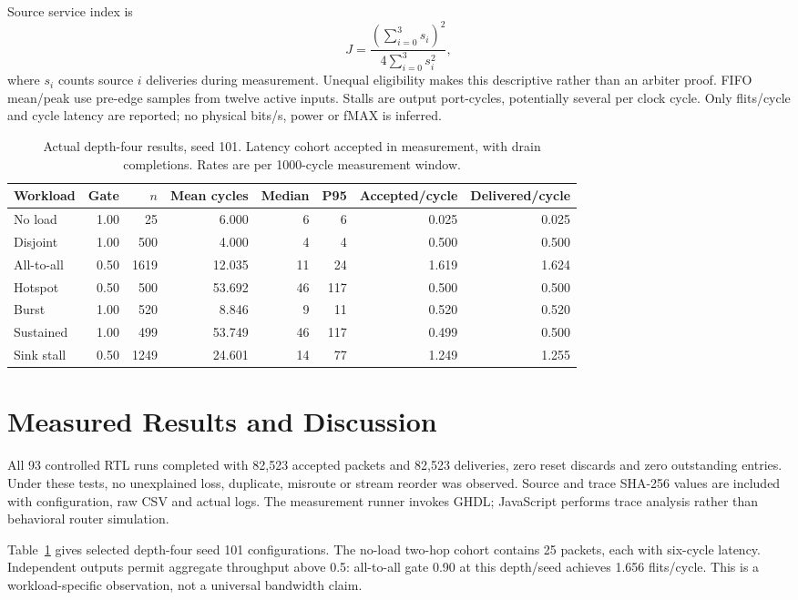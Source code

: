 \documentclass[conference,a4paper]{IEEEtran}
\begin{document}
Source service index is
\begin{equation}
J=\frac{(\sum_{i=0}^{3}s_i)^2}{4\sum_{i=0}^{3}s_i^2},
\end{equation}
where $s_i$ counts source $i$ deliveries during measurement. Unequal eligibility makes this descriptive rather than an arbiter proof. FIFO mean/peak use pre-edge samples from twelve active inputs. Stalls are output port-cycles, potentially several per clock cycle. Only flits/cycle and cycle latency are reported; no physical bits/s, power or fMAX is inferred.
\begin{table}[t]
\caption{Actual depth-four results, seed 101. Latency cohort accepted in measurement, with drain completions. Rates are per 1000-cycle measurement window.}\label{tab:results}
\centering\begin{tabular}{lrrrrrrr}\toprule
Workload & Gate & $n$ & Mean cycles & Median & P95 & Accepted/cycle & Delivered/cycle \\\midrule
No load & 1.00 & 25 & 6.000 & 6 & 6 & 0.025 & 0.025 \\
Disjoint & 1.00 & 500 & 4.000 & 4 & 4 & 0.500 & 0.500 \\
All-to-all & 0.50 & 1619 & 12.035 & 11 & 24 & 1.619 & 1.624 \\
Hotspot & 0.50 & 500 & 53.692 & 46 & 117 & 0.500 & 0.500 \\
Burst & 1.00 & 520 & 8.846 & 9 & 11 & 0.520 & 0.520 \\
Sustained & 1.00 & 499 & 53.749 & 46 & 117 & 0.499 & 0.500 \\
Sink stall & 0.50 & 1249 & 24.601 & 14 & 77 & 1.249 & 1.255 \\
\bottomrule\end{tabular}
\end{table}
\section{Measured Results and Discussion}
All 93 controlled RTL runs completed with 82,523 accepted packets and 82,523 deliveries, zero reset discards and zero outstanding entries. Under these tests, no unexplained loss, duplicate, misroute or stream reorder was observed. Source and trace SHA-256 values are included with configuration, raw CSV and actual logs. The measurement runner invokes GHDL; JavaScript performs trace analysis rather than behavioral router simulation.

Table~\ref{tab:results} gives selected depth-four seed 101 configurations. The no-load two-hop cohort contains 25 packets, each with six-cycle latency. Independent outputs permit aggregate throughput above 0.5: all-to-all gate 0.90 at this depth/seed achieves 1.656 flits/cycle. This is a workload-specific observation, not a universal bandwidth claim.
\end{document}
